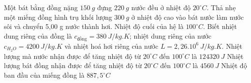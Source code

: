 \begin{ex}
Một bát bằng đồng nặng $150 \ g$ đựng $220 \ g$ nước đều ở nhiệt độ $20^\circ C$. Thả nhẹ một miếng đồng hình trụ khối lượng $300 \ g$ ở nhiệt độ cao vào bát nước làm nước sôi và chuyển 5,00 g nước thành hơi. Nhiệt độ cuối của hệ là $100^\circ C$. Biết nhiệt dung riêng của đồng là $c_{\text{đồng}}=380 \ J / kg . K$; nhiệt dung riêng của nước $c_{H_2 O}=4200 \ J / kg . K$ và nhiệt hoá hơi riêng của nước $L=2,26.10^{6} \ J / kg . K$. 
{Nhiệt lượng mà nước nhận được để tăng nhiệt độ từ $20^\circ C$ đến $100^\circ C$ là $124320 \ J$}
{\True Nhiệt lượng bát đồng nhận được để tăng nhiệt độ từ $20^\circ C$ đến $100^\circ C$ là $4560 \ J$}
{\True Nhiệt độ ban đầu của miếng đồng là $887,5^\circ C$}
\end{ex}



